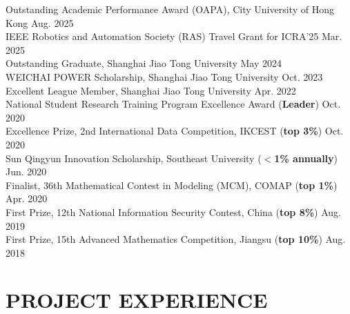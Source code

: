 \documentclass[letterpaper,11pt]{article}
\begin{document}
{{{{{{\begin{flushleft}
    \normalsize
    {Outstanding Academic Performance Award (OAPA), City University of Hong Kong \cftdotfill{\cftdotsep}Aug. 2025}\\
    \vspace{1mm}
    {IEEE Robotics and Automation Society (RAS) Travel Grant for ICRA'25 \cftdotfill{\cftdotsep}Mar. 2025}\\
    \vspace{1mm}
    {Outstanding Graduate, Shanghai Jiao Tong University \cftdotfill{\cftdotsep}May 2024}\\
    \vspace{1mm}
    {WEICHAI POWER Scholarship, Shanghai Jiao Tong University \cftdotfill{\cftdotsep}Oct. 2023}\\
    \vspace{1mm}
    {Excellent League Member, Shanghai Jiao Tong University \cftdotfill{\cftdotsep}Apr. 2022}\\
    \vspace{1mm}
    {National Student Research Training Program Excellence Award (\textbf{Leader}) \cftdotfill{\cftdotsep}Oct. 2020}\\
    \vspace{1mm}
    {Excellence Prize, 2nd International Data Competition, IKCEST (\textbf{top 3\%}) \cftdotfill{\cftdotsep}Oct. 2020}\\
    \vspace{1mm}
    {Sun Qingyun Innovation Scholarship, Southeast University (\textbf{$<$1\% annually}) \cftdotfill{\cftdotsep}Jun. 2020}\\
    \vspace{1mm}
    {Finalist, 36th Mathematical Contest in Modeling (MCM), COMAP (\textbf{top 1\%}) \cftdotfill{\cftdotsep}Apr. 2020}\\
    \vspace{1mm}
    {First Prize, 12th National Information Security Contest, China (\textbf{top 8\%}) \cftdotfill{\cftdotsep}Aug. 2019}\\
    \vspace{1mm}
    {First Prize, 15th Advanced Mathematics Competition, Jiangsu (\textbf{top 10\%}) \cftdotfill{\cftdotsep}Aug. 2018}
\end{flushleft}



\section{\textbf{PROJECT EXPERIENCE}}
\vspace{2mm}

}}}}}}
\end{document}
